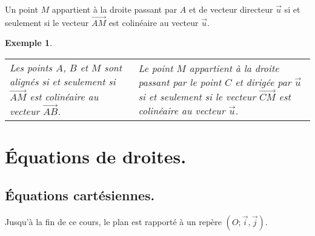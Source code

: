 \documentclass[a4paper,11pt]{article}
\theoremstyle{break}
\newcounter{enonce}
\newtheorem{exemple}[enonce]{Exemple}
\begin{document}
   \begin{proposition}
    Un point $M$ appartient à la droite passant par $A$ et de vecteur directeur $\vec{u}$
    si et seulement si le vecteur {$\vec{AM}$} est colinéaire au vecteur $\vec{u}$.
   \end{proposition}
   
   \begin{exemple}
  ~
  \begin{center}
  

   
\begin{tabular}{p{4.7cm}|p{4.7cm}}
Les points $A$, $B$ et $M$ sont alignés si et seulement si
{$\vec{AM}$} est colinéaire au vecteur $\vec{AB}$.
&
Le point $M$ appartient à la droite passant par le point $C$ et dirigée par $\vec{u}$
si et seulement si le vecteur {$\vec{CM}$} est colinéaire au vecteur {$\vec{u}$}.
\end{tabular}
\end{center}
  \end{exemple}
  
   \section{\'Equations de droites.}
   
   \subsection{\'Equations cartésiennes.}

    
    Jusqu'à la fin de ce cours, le plan est rapporté à un repère $(O;\vec{i},\vec{j})$.
\end{document}
